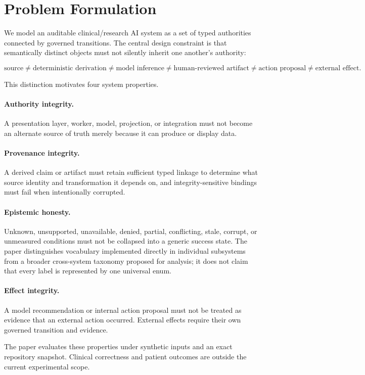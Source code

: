 \section{Problem Formulation}

We model an auditable clinical/research AI system as a set of typed authorities connected by governed transitions. The central design constraint is that semantically distinct objects must not silently inherit one another's authority:

\begin{equation}
\text{source} \neq \text{deterministic derivation} \neq \text{model inference} \neq \text{human-reviewed artifact} \neq \text{action proposal} \neq \text{external effect}.
\end{equation}

This distinction motivates four system properties.

\paragraph{Authority integrity.} A presentation layer, worker, model, projection, or integration must not become an alternate source of truth merely because it can produce or display data.

\paragraph{Provenance integrity.} A derived claim or artifact must retain sufficient typed linkage to determine what source identity and transformation it depends on, and integrity-sensitive bindings must fail when intentionally corrupted.

\paragraph{Epistemic honesty.} Unknown, unsupported, unavailable, denied, partial, conflicting, stale, corrupt, or unmeasured conditions must not be collapsed into a generic success state. The paper distinguishes vocabulary implemented directly in individual subsystems from a broader cross-system taxonomy proposed for analysis; it does not claim that every label is represented by one universal enum.

\paragraph{Effect integrity.} A model recommendation or internal action proposal must not be treated as evidence that an external action occurred. External effects require their own governed transition and evidence.

The paper evaluates these properties under synthetic inputs and an exact repository snapshot. Clinical correctness and patient outcomes are outside the current experimental scope.
